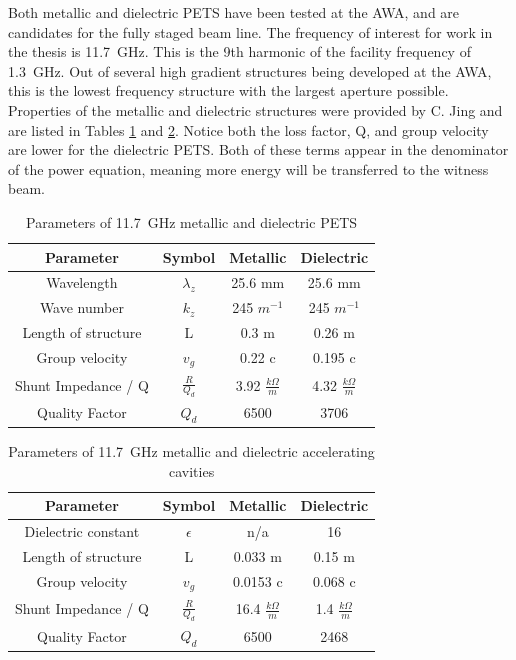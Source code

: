 Both metallic and dielectric PETS have been tested at the AWA, 
and are candidates for the fully staged beam line. 
The frequency of interest for work in the thesis is \SI{11.7}{GHz}. 
This is the 9th harmonic of the facility frequency of \SI{1.3}{GHz}.
Out of several high gradient structures being developed at the AWA, 
this is the lowest frequency structure with the largest aperture possible. 
Properties of the metallic and dielectric structures were provided by C. Jing and are listed in 
Tables \ref{table:PETS} and \ref{table:acc}. 
Notice both the loss factor, Q, and group velocity are lower for the dielectric PETS. 
Both of these terms appear in the denominator of the power equation, meaning more
energy will be transferred to the witness beam.
\begin{table}
	\begin{center}
	\caption{Parameters of \SI{11.7}{GHz} metallic and dielectric PETS}
	\label{table:PETS}
	
			\begin{tabular}{cccc}  
			\toprule
			\toprule
			\textbf{Parameter} & \textbf{Symbol} & \textbf{Metallic }& \textbf{Dielectric} \\
			\midrule
			Wavelength 	& $\lambda_{z}$ & 25.6 mm 	&  25.6 mm	\\  
			Wave number & $k_{z}$ 		& 245 $m^{-1}$ 	& 245 $m^{-1}$\\  
			Length of structure & L & 0.3 m & 0.26 m\\  
			Group velocity & $v_{g}$ & 0.22 c & 0.195 c\\  
			Shunt Impedance / Q & $\frac{R}{Q_{d}}$ & 3.92 $\frac{k\Omega}{m}$  & 4.32 $\frac{k\Omega}{m}$\\  
			Quality Factor & $Q_{d}$ & 6500 &3706\\  
			\bottomrule		
		\end{tabular}
\end{center}
\end{table}
\begin{table}
	\begin{center}
		\caption{Parameters of \SI{11.7}{GHz} metallic and dielectric accelerating cavities}
		\label{table:acc}
		
		\begin{tabular}{cccc}  
			\toprule
			\toprule
			\textbf{Parameter} & \textbf{Symbol} & \textbf{Metallic }& \textbf{Dielectric} \\
			\midrule
			Dielectric constant & $\epsilon$ & n/a & 16 \\
			Length of structure & L & 0.033 m & 0.15 m\\  
			Group velocity & $v_{g}$ & 0.0153 c & 0.068 c\\  
			Shunt Impedance / Q & $\frac{R}{Q_{d}}$ & 16.4 $\frac{k\Omega}{m}$  & 1.4 $\frac{k\Omega}{m}$\\  
			Quality Factor & $Q_{d}$ & 6500  &2468\\  
			\bottomrule		
		\end{tabular}
	\end{center}
\end{table}

